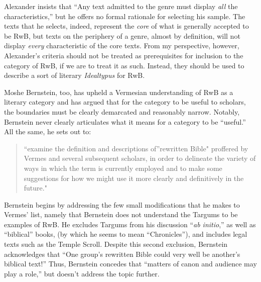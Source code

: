 Alexander insists that ``Any text admitted to the genre must display
\emph{all} the characteristics,''\autocite[119 n.
11]{alexander_carson-williamson1988} but he offers no formal rationale
for selecting his sample. The texts that he selects, indeed, represent
the \emph{core} of what is generally accepted to be RwB, but texts on
the periphery of a genre, almost by definition, will not display
\emph{every} characteristic of the core texts. From my perspective,
however, Alexander's criteria should not be treated as prerequisites for
inclusion to the category of RwB, if we are to treat it as such.
Instead, they should be used to describe a sort of literary
\emph{Idealtypus} for RwB.

Moshe Bernstein, too, has upheld a Vermesian understanding of RwB as a
literary category and has argued that for the category to be useful to
scholars, the boundaries must be clearly demarcated and reasonably
narrow.\autocite{bernstein_textus2005} Notably, Bernstein never clearly
articulates what it means for a category to be ``useful.'' All the same,
he sets out to:

\begin{quote}
``examine the definition and descriptions of''rewritten Bible" proffered
by Vermes and several subsequent scholars, in order to delineate the
variety of ways in which the term is currently employed and to make some
suggestions for how we might use it more clearly and definitively in the
future." \autocite[171--172]{bernstein_textus2005}
\end{quote}

Bernstein begins by addressing the few small modifications that he makes
to Vermes' list, namely that Bernstein does not understand the Targums
to be examples of RwB. He excludes Targums from his discussion
``\emph{ab initio},'' as well as ``biblical'' books, (by which he seems
to mean ``Chronicles''), and includes legal texts such as the
Temple Scroll. Despite this second exclusion, Bernstein acknowledges
that ``One group's rewritten Bible could very well be another's biblical
text!''\autocite[This seems particularly odd, since, and Ethiopian
Christian may protest that Jubilees should be excluded as
well.][175]{bernstein_textus2005} Thus, Bernstein concedes that
``matters of canon and audience may play a role,'' but doesn't address
the topic further.

